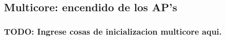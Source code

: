 \subsection{Multicore: encendido de los AP's}
    \subsubsection{TODO: Ingrese cosas de inicializacion multicore aqui.}